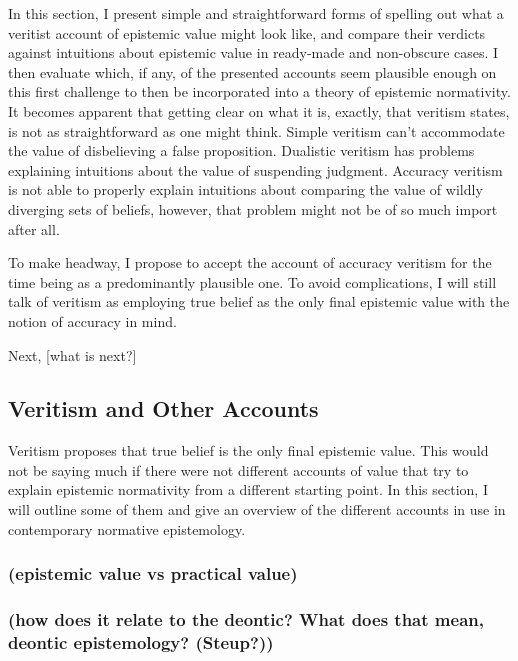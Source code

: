\documentclass[12pt,numbers=noenddot]{scrartcl}
\begin{document}
In this section, I present simple and straightforward forms of spelling out what a veritist account of epistemic value might look like, and compare their verdicts against intuitions about epistemic value in ready-made and non-obscure cases. I then evaluate which, if any, of the presented accounts seem plausible enough on this first challenge to then be incorporated into a theory of epistemic normativity. It becomes apparent that getting clear on what it is, exactly, that veritism states, is not as straightforward as one might think. Simple veritism can't accommodate the value of disbelieving a false proposition. Dualistic veritism has problems explaining intuitions about the value of suspending judgment. Accuracy veritism is not able to properly explain intuitions about comparing the value of wildly diverging sets of beliefs, however, that problem might not be of so much import after all.

To make headway, I propose to accept the account of accuracy veritism for the time being as a predominantly plausible one. To avoid complications, I will still talk of veritism as employing true belief as the only final epistemic value with the notion of accuracy in mind.

Next, [what is next?]

\subsection{Veritism and Other Accounts}

Veritism proposes that true belief is the only final epistemic value. This would not be saying much if there were not different accounts of value that try to explain epistemic normativity from a different starting point. In this section, I will outline some of them and give an overview of the different accounts in use in contemporary normative epistemology.

\subsubsection{ (epistemic value vs practical value)}
\subsubsection{ (how does it relate to the deontic? What does that mean, deontic epistemology? (Steup?))}
\end{document}
